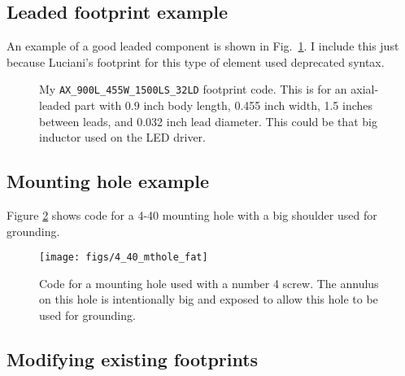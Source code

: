 \subsection{Leaded footprint example}
An example of a good leaded component is shown in Fig.\
\ref{leaded_example}.  I include this just because Luciani's footprint
for this type of element used deprecated syntax.
\begin{figure}[ht]
  \begin{center}
    \begin{minipage}{10cm}
      
    \end{minipage}
    \caption{My \texttt{AX\_900L\_455W\_1500LS\_32LD} footprint code.
      This is for an axial-leaded part with 0.9 inch body length,
      0.455 inch width, 1.5 inches between leads, and 0.032 inch lead
      diameter.  This could be that big inductor used on the LED
      driver.\label{leaded_example}}
  \end{center}
\end{figure}

\clearpage
\subsection{Mounting hole example}
Figure \ref{fig:mthole} shows code for a 4-40 mounting hole with a big shoulder used for grounding.  

\begin{figure}[ht]
  \begin{center}
    \texttt{[image: figs/4\_40\_mthole\_fat]}
    \caption{Code for a mounting hole used with a number 4 screw.  The
      annulus on this hole is intentionally big and exposed to allow
      this hole to be used for grounding.\label{fig:mthole}}
  \end{center}
\end{figure}




\clearpage
\subsection{Modifying existing footprints}

